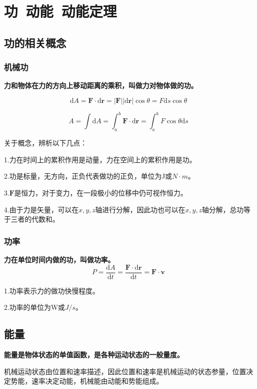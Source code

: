 
\section{功~动能~动能定理}

\subsection{功的相关概念}

\subsubsection{机械功}

\textbf{力和物体在力的方向上移动距离的乘积，叫做力对物体做的功。}

	$$\mathrm{d}A=\mathbf{F}\cdotp\mathrm{d}\mathbf{r}=|\mathbf{F}| |\mathrm{d}\mathbf{r}|\cos\theta=F\mathrm{d}s\cos\theta$$
	
	$$ A=\int\mathrm{d}A=\int_{a}^{b}\mathbf{F}\cdotp\mathrm{d}\mathbf{r}=\int_{a}^{b} F\cos\theta\mathrm{d}s$$
	
关于概念，辨析以下几点：

1.力在时间上的累积作用是动量，力在空间上的累积作用是功。

2.功是标量，无方向，正负代表做功的正负，单位为J或$N\cdotp m$。

3.$\mathbf{F}$是恒力，对于变力，在一段极小的位移中仍可视作恒力。

4.由于力是矢量，可以在$x,y,z$轴进行分解，因此功也可以在$x,y,z$轴分解，总功等于三者的代数和。

\subsubsection{功率}

\textbf{力在单位时间内做的功，叫做功率。}
$$P=\dfrac{\mathrm{d}A}{\mathrm{d}t}=\dfrac{\mathbf{F}\cdotp\mathrm{d}\mathbf{r}}{\mathrm{d}t}=\mathbf{F}\cdotp\mathbf{v}$$

1.功率表示力的做功快慢程度。

2.功率的单位为W或$J/s$。

\subsection{能量}

\textbf{能量是物体状态的单值函数，是各种运动状态的一般量度。}

机械运动状态由位置和速率描述，因此位置和速率是机械运动的状态参量，位置决定势能，速率决定动能，机械能由动能和势能组成。

